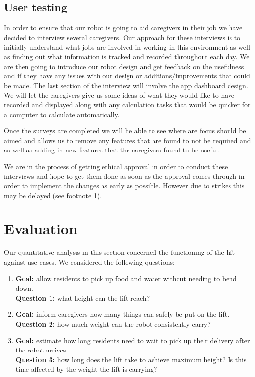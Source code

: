 \documentclass{article}
\begin{document}
\subsection{User testing}
\par In order to ensure that our robot is going to aid caregivers in their job we have decided to interview several caregivers. Our approach for these interviews is to initially understand what jobs are involved in working in this environment as well as finding out what information is tracked and recorded throughout each day. We are then going to introduce our robot design and get feedback on the usefulness and if they have any issues with our design or additions/improvements that could be made. The last section of the interview will involve the app dashboard design. We will let the caregivers give us some ideas of what they would like to have recorded and displayed along with any calculation tasks that would be quicker for a computer to calculate automatically.
\par Once the surveys are completed we will be able to see where are focus should be aimed and allows us to remove any features that are found to not be required and as well as adding in new features that the caregivers found to be useful.
\par We are in the process of getting ethical approval in order to conduct these interviews and hope to get them done as soon as the approval comes through in order to implement the changes as early as possible. However due to strikes this may be delayed (see footnote 1).

\section{Evaluation}
Our quantitative analysis in this section concerned the functioning of the lift against use-cases. We considered the following questions:
\begin{enumerate}
\item {\bf Goal:} allow residents to pick up food and water without needing to bend down. \\{\bf Question 1: } what height can the lift reach?
\item {\bf Goal:} inform caregivers how many things can safely be put on the lift. \\{\bf Question 2: }how much weight can the robot consistently carry?
\item {\bf Goal:} estimate how long residents need to wait to pick up their delivery after the robot arrives. \\{\bf Question 3: } how long does the lift take to achieve maximum height? Is this time affected by the weight the lift is carrying?
\end{enumerate}
\end{document}
